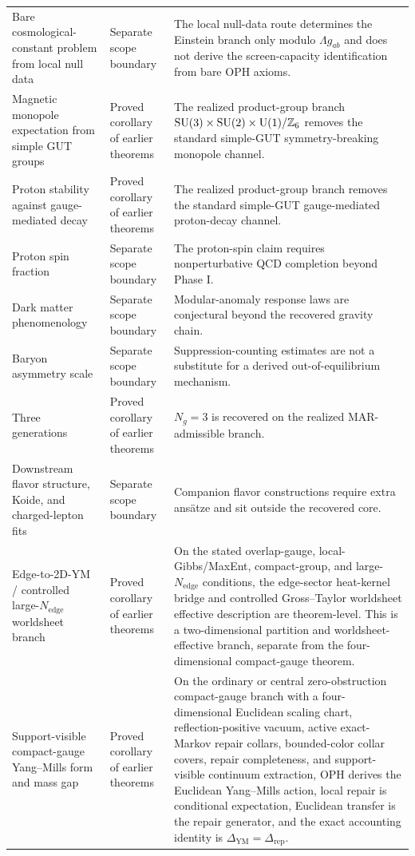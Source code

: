 \begin{center}
\begin{tabular}{@{}>{\raggedright\arraybackslash}p{}>{\raggedright\arraybackslash}p{}>{\raggedright\arraybackslash}p{}@{}}
Bare cosmological-constant problem from local null data & Separate scope boundary & The local null-data route determines the Einstein branch only modulo \(\Lambda g_{ab}\) and does not derive the screen-capacity identification from bare OPH axioms. \\
Magnetic monopole expectation from simple GUT groups & Proved corollary of earlier theorems & The realized product-group branch \(\mathrm{SU}(3)\times\mathrm{SU}(2)\times\mathrm{U}(1)/\mathbb Z_6\) removes the standard simple-GUT symmetry-breaking monopole channel. \\
Proton stability against gauge-mediated decay & Proved corollary of earlier theorems & The realized product-group branch removes the standard simple-GUT gauge-mediated proton-decay channel. \\
Proton spin fraction & Separate scope boundary & The proton-spin claim requires nonperturbative QCD completion beyond Phase I. \\
Dark matter phenomenology & Separate scope boundary & Modular-anomaly response laws are conjectural beyond the recovered gravity chain. \\
Baryon asymmetry scale & Separate scope boundary & Suppression-counting estimates are not a substitute for a derived out-of-equilibrium mechanism. \\
Three generations & Proved corollary of earlier theorems & \(N_g=3\) is recovered on the realized MAR-admissible branch. \\
Downstream flavor structure, Koide, and charged-lepton fits & Separate scope boundary & Companion flavor constructions require extra ans\"atze and sit outside the recovered core. \\
Edge-to-2D-YM / controlled large-\(N_{\mathrm{edge}}\) worldsheet branch & Proved corollary of earlier theorems & On the stated overlap-gauge, local-Gibbs/MaxEnt, compact-group, and large-\(N_{\mathrm{edge}}\) conditions, the edge-sector heat-kernel bridge and controlled Gross--Taylor worldsheet effective description are theorem-level. This is a two-dimensional partition and worldsheet-effective branch, separate from the four-dimensional compact-gauge theorem. \\
Support-visible compact-gauge Yang--Mills form and mass gap & Proved corollary of earlier theorems & On the ordinary or central zero-obstruction compact-gauge branch with a four-dimensional Euclidean scaling chart, reflection-positive vacuum, active exact-Markov repair collars, bounded-color collar covers, repair completeness, and support-visible continuum extraction, OPH derives the Euclidean Yang--Mills action, local repair is conditional expectation, Euclidean transfer is the repair generator, and the exact accounting identity is \(\Delta_{\mathrm{YM}}=\Delta_{\mathrm{rep}}\). \\

\end{tabular}
\end{center}
